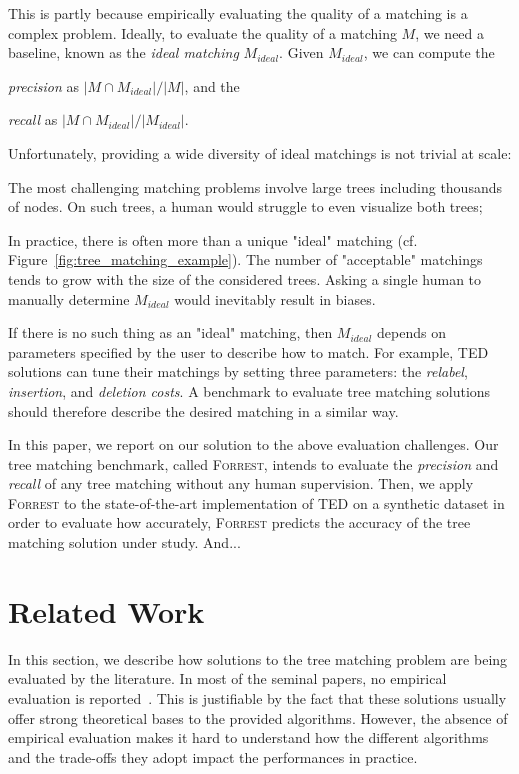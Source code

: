 \documentclass{vldb}
\newcommand{\forrest}[0]{\textsc{Forrest}\xspace}
\begin{document}
This is partly because empirically evaluating the quality of a matching is a complex problem.
Ideally, to evaluate the quality of a matching $M$, we need a baseline, known as the \emph{ideal matching} $M_{ideal}$.
Given $M_{ideal}$, we can compute the
\begin{inparadesc}
    \item[\emph{precision}] as $|M \cap M_{ideal}| / |M|$, and the
    \item[\emph{recall}] as $|M \cap M_{ideal}| / |M_{ideal}|$.
\end{inparadesc}

Unfortunately, providing a wide diversity of ideal matchings is not trivial at scale:
\begin{compactenum}
    \item The most challenging matching problems involve large trees including thousands of nodes.
    On such trees, a human would struggle to even visualize both trees;
    \item In practice, there is often more than a unique "ideal" matching (cf. Figure~\ref{fig:tree_matching_example}).
    The number of "acceptable" matchings tends to grow with the size of the considered trees.
    Asking a single human to manually determine $M_{ideal}$ would inevitably result in biases.
\end{compactenum}

If there is no such thing as an "ideal" matching, then $M_{ideal}$ depends on parameters specified by the user to describe how to match.
For example, TED solutions can tune their matchings by setting three parameters: the \emph{relabel}, \emph{insertion}, and \emph{deletion costs}.
A benchmark to evaluate tree matching solutions should therefore describe the desired matching in a similar way.

In this paper, we report on our solution to the above evaluation challenges.
Our tree matching benchmark, called \forrest, intends to evaluate the \emph{precision} and \emph{recall} of any tree matching without any human supervision.
Then, we apply \forrest to the state-of-the-art implementation of TED on a synthetic dataset in order to evaluate how accurately, \forrest predicts the accuracy of the tree matching solution under study.
And...

\section{Related Work}\label{sec:related_work}
In this section, we describe how solutions to the tree matching problem are being evaluated by the literature.
In most of the seminal papers, no empirical evaluation is reported~\cite{jiang1994alignment,valiente2001efficient,zhang1995algorithms, Dinitz1998OnIsomorphism, Bunke1998ASubgraph, Wang2001FindingHierarchy}.
This is justifiable by the fact that these solutions usually offer strong theoretical bases to the provided algorithms.
However, the absence of empirical evaluation makes it hard to understand how the different algorithms and the trade-offs they adopt impact the performances in practice.
\end{document}
